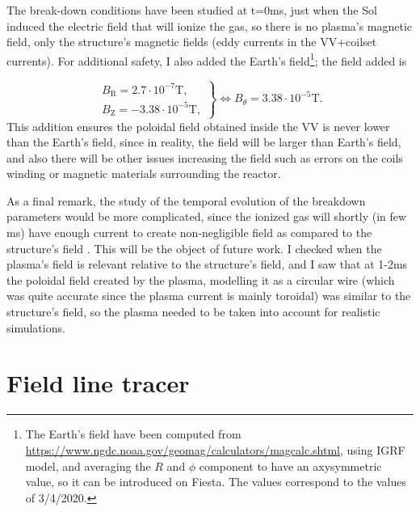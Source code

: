 \documentclass[a4paper,12pt,oneside]{book}
\begin{document}
The break-down conditions have been studied at t=0ms, just when the Sol induced the electric field that will ionize the gas, so there is no plasma's magnetic field, only the structure's magnetic fields (eddy currents in the VV+coilset currents). For additional safety, I also added the Earth's field\footnote{The Earth's field have been computed from \url{https://www.ngdc.noaa.gov/geomag/calculators/magcalc.shtml}, using IGRF model, and averaging the $R$ and $\phi$ component to have an axysymmetric value, so it can be introduced on Fiesta. The values correspond to the values of 3/4/2020.}; the field added is

\begin{equation}
\left.
\begin{array}{c}
B_\text{R}=2.7 \cdot 10^{-7}\text{T}, \\
B_\text{Z}=-3.38 \cdot 10^{-5}\text{T},
\end{array}
\right\}
\Leftrightarrow B_\theta=3.38 \cdot 10^{-5}\text{T}.
\end{equation}
%
This addition ensures the poloidal field obtained inside the VV is never lower than the Earth's field, since in reality, the field will be larger than Earth's field, and also there will be other issues increasing the field such as errors on the coils winding or magnetic materials surrounding the reactor.

As a final remark, the study of the temporal evolution of the breakdown parameters would be more complicated, since the ionized gas will shortly (in few ms) have enough current to create non-negligible field as compared to the structure's field
. This will be the object of future work. I checked when the plasma's field is relevant relative to the structure's field, and I saw that at 1-2ms the poloidal field created by the plasma, modelling it as a circular wire (which was quite accurate since the plasma current is mainly toroidal) was similar to the structure's field, so the plasma needed to be taken into account for realistic simulations.

\section{Field line tracer}
\end{document}
